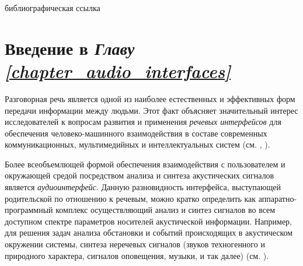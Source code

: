 \begin{SCn}
\bigskip

\begin{scnrelfromlist}{библиографическая ссылка}
\end{scnrelfromlist}

\end{SCn}


\section*{Введение в \textit{Главу \ref{chapter_audio_interfaces}}}
\label{sec_audio_interfaces_review}

Разговорная речь является одной из наиболее естественных и эффективных форм передачи информации между людьми. Этот факт объясняет значительный интерес исследователей к вопросам развития и применения \textit{речевых интерфейсов} для обеспечения человеко-машинного взаимодействия в составе современных коммуникационных, мультимедийных и интеллектуальных систем (см. , ).

Более всеобъемлющей формой обеспечения взаимодействия с пользователем и окружающей средой посредством анализа и синтеза акустических сигналов является \textit{аудиоинтерфейс}. Данную разновидность интерфейса, выступающей родительской по отношению к речевым, можно кратко определить как аппаратно-программный комплекс осуществляющий анализ и синтез сигналов во всем доступном спектре параметров носителей акустической информации. Например, для решения задач анализа обстановки и событий происходящих в акустическом окружении системы, синтеза неречевых сигналов (звуков техногенного и природного характера, сигналов оповещения, музыки, и так далее) (см. ).

